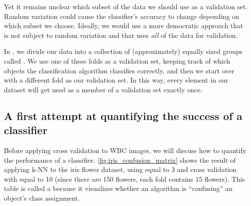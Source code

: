 Yet it remains unclear which subset of the data we should use as a validation set. Random variation could cause the classifier's accuracy to change depending on which subset we choose. Ideally, we would use a more democratic approach that is not subject to random variation and that uses \textit{all} of the data for validation.

In , we divide our data into a collection of  (approximately) equally sized groups called . We use one of these folds as a validation set, keeping track of which objects the classification algorithm classifies correctly, and then we start over with a different fold as our validation set. In this way, every element in our dataset will get used as a member of a validation set exactly once.

\FloatBarrier
{}
\subsection{A first attempt at quantifying the success of a classifier}

Before applying cross validation to WBC images, we will discuss how to quantify the performance of a classifier. \autoref{fig:iris_confusion_matrix} shows the result of applying k-NN to the iris flower dataset, using  equal to 3 and cross validation with  equal to 10 (since there are 150 flowers, each fold contains 15 flowers). This table is called a  because it visualizes whether an algorithm is ``confusing'' an object's class assignment.\\

